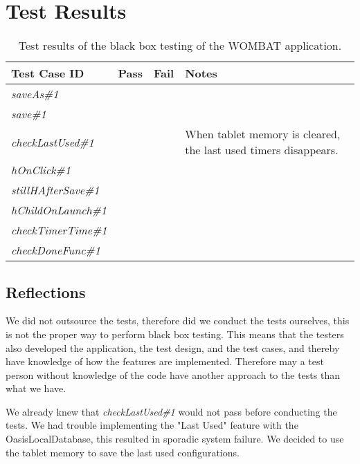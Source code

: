 \section{Test Results}
	
	\begin{table}[width=\textwidth]
		\begin{center}
			\begin{tabular}{|l|c|c|p{6cm}|}
				\hline
				\textbf{Test Case ID} & \textbf{Pass} & \textbf{Fail} & \textbf{Notes} \\
				\hline
				\textit{saveAs\#1} & \checkmark &  &  \\
				\hline
				\textit{save\#1} & \checkmark &  &  \\
				\hline
				\textit{checkLastUsed\#1} &  & \checkmark & When tablet memory is cleared, the last used timers disappears. \\
				\hline
				\textit{hOnClick\#1} & \checkmark &  &  \\
				\hline
				\textit{stillHAfterSave\#1} & \checkmark &  &  \\
				\hline
				\textit{hChildOnLaunch\#1} & \checkmark &  &  \\
				\hline
				\textit{checkTimerTime\#1} & \checkmark &  &  \\
				\hline
				\textit{checkDoneFunc\#1} & \checkmark &  &  \\
				\hline
			\end{tabular}
			\caption{Test results of the black box testing of the WOMBAT application.}
			\label{tab:bb_test_results}
		\end{center}
	\end{table}

\subsection{Reflections}
We did not outsource the tests, therefore did we conduct the tests ourselves, this is not the proper way to perform black box testing. 
This means that the testers also developed the application, the test design, and the test cases, and thereby have knowledge of how the features are implemented.
Therefore may a test person without knowledge of the code have another approach to the tests than what we have.

We already knew that \textit{checkLastUsed\#1} would not pass before conducting the tests. 
We had trouble implementing the "Last Used" feature with the OasisLocalDatabase, this resulted in sporadic system failure.
We decided to use the tablet memory to save the last used configurations.